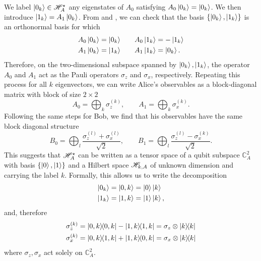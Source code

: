 We label $\ket{0_k} \in \mathscr{H}_A^\star$ any eigenstates of $A_0$ satisfying $A_0 \ket{0_k} = \ket{0_k} $.
We then introduce $\ket{1_k} = A_1 \ket{0_k}$.
From  and , we can check that the basis $\{\ket{0_k},\ket{1_k}\}$ is an orthonormal basis for which
\begin{equation}
	\begin{split}
		A_0 \ket{0_k} = \ket{0_k} \qquad & A_0 \ket{1_k} = -\ket{1_k} \\
		A_1 \ket{0_k} = \ket{1_k} \qquad & A_1 \ket{1_k} = \ket{0_k}.
	\end{split}
\end{equation}
Therefore, on the two-dimensional subspace spanned by $\ket{0_k},\ket{1_k}$, the operator $A_0$ and $A_1$ act as the Pauli operators $\sigma_z$ and $\sigma_x$, respectively. 
Repeating this process for all $k$ eigenvectors, we can write Alice's observables as a block-diagonal matrix with block of size $2 \times 2$
\begin{equation}
	A_0 = \bigoplus_k \sigma_z^{(k)}, \qquad A_1 = \bigoplus_k \sigma_x^{(k)}.
\end{equation}
Following the same steps for Bob, we find that his observables have the same block diagonal structure
\begin{equation}
	B_0 = \bigoplus_l \frac{\sigma_z^{(l)}+\sigma_x^{(l)}}{\sqrt{2}}, \qquad B_1 = \bigoplus_l \frac{\sigma_z^{(l)}-\sigma_x^{(k)}}{\sqrt{2}}.
\end{equation}
This suggests that $\mathscr{H}_A^\star$ can be written as a tensor space of a qubit subspace $\mathds{C}_A^2$ with basis $\{\ket{0},\ket{1}\}$ and a Hilbert space $\mathscr{H}_{k,A}$ of unknown dimension and carrying the label $k$.
Formally, this allows us to write the decomposition
\begin{equation}
	\begin{split}
		\ket{0_k} &= \ket{0,k} = \ket{0}\ket{k} \\
		\ket{1_k} &= \ket{1,k} = \ket{1}\ket{k},
	\end{split}	
\end{equation}
and, therefore
\begin{equation}
	\begin{split}
		\sigma_z^{(k)} &= \ketbra{0,k}-\ketbra{1,k} = \sigma_z \otimes \ketbra{k} \\
		\sigma_x^{(k)} &= \ketbra{0,k}{1,k}+\ketbra{1,k}{0,k} = \sigma_x \otimes \ketbra{k}
	\end{split}
\end{equation}
where $\sigma_z,\sigma_x$ act solely on $\mathds{C}^2_A$.
